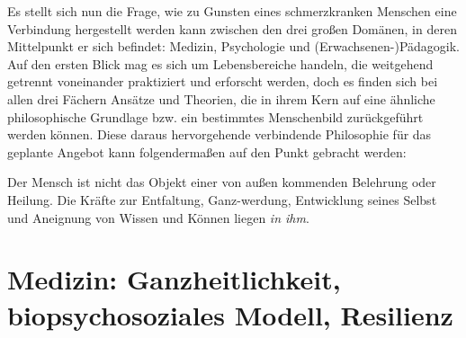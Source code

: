 \documentclass[
  twoside,
  parskip=half-,
]{scrreprt}
\begin{document}
Es stellt sich nun die Frage, wie zu Gunsten eines schmerzkranken Menschen eine Verbindung hergestellt werden kann zwischen den drei großen Domänen, in deren Mittelpunkt er sich befindet: Medizin, Psychologie und (Erwachsenen-)Pädagogik. Auf den ersten Blick mag es sich um Lebensbereiche handeln, die weitgehend getrennt voneinander praktiziert und erforscht werden, doch es finden sich bei allen drei Fächern Ansätze und Theorien, die in ihrem Kern auf eine ähnliche philosophische Grundlage bzw. ein bestimmtes Menschenbild zurückgeführt werden können. Diese daraus hervorgehende verbindende Philosophie für das geplante Angebot kann folgendermaßen auf den Punkt gebracht werden:

\begin{displayquote}\normalfont
  Der Mensch ist nicht das Objekt einer von außen kommenden Belehrung oder Heilung. Die Kräfte zur Entfaltung, Ganz-werdung, Entwicklung seines Selbst und Aneignung von Wissen und Können liegen \textit{in ihm}.
\end{displayquote}

\section{Medizin: Ganzheitlichkeit, biopsychosoziales Modell, Resilienz} 
\end{document}
